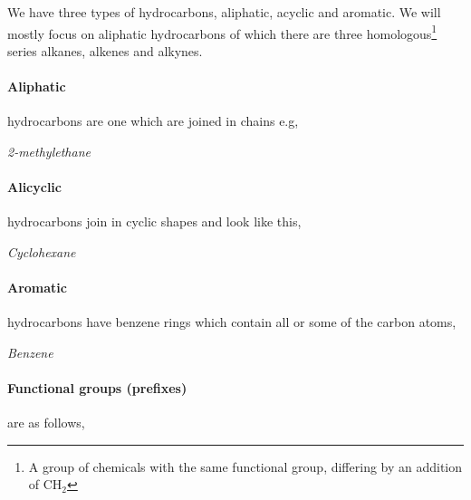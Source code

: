 \documentclass[11pt,a4paper]{memoir}
\begin{document}
	We have three types of hydrocarbons, aliphatic, acyclic and aromatic. We will mostly focus on aliphatic hydrocarbons of which there are three homologous\footnote{A group of chemicals with the same functional group, differing by an addition of CH$_2$} series alkanes, alkenes and alkynes.
	
	\paragraph{Aliphatic} hydrocarbons are one which are joined in chains e.g,
	\begin{center}
		
		\textit{2-methylethane}
	\end{center}
	
	\begin{samepage}
	\paragraph{Alicyclic} hydrocarbons join in cyclic shapes and look like this,
	\begin{center}
		
		\textit{Cyclohexane}
	\end{center}
	\end{samepage}
	
	\paragraph{Aromatic} hydrocarbons have benzene rings which contain all or some of the carbon atoms,
	\begin{center}
		
		\textit{Benzene}
	\end{center}
	
	\paragraph{Functional groups (prefixes)} are as follows,
\end{document}
